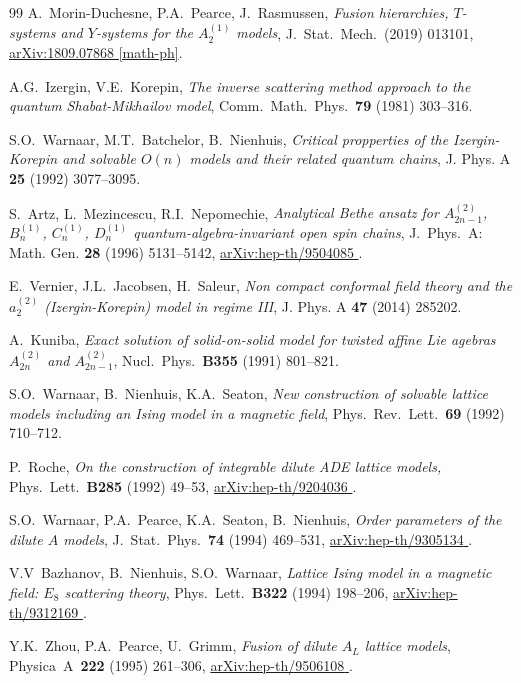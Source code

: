 \documentclass[11pt]{article}
\numberwithin{equation}{section}
\theoremstyle{plain}
\numberwithin{equation}{section}
\def\arxiv#1#2{\href{http://arxiv.org/abs/#1}{\textsf{arXiv:#1 #2}}}
\begin{document}
\begin{thebibliography}{99}
	A.~Morin-Duchesne, P.A.~Pearce, J.~Rasmussen,
	{\em Fusion hierarchies, $T$-systems and $Y$-systems for the $A_2^{(1)}$ models}, 
	J.~Stat.~Mech.~(2019) 013101,
	\arxiv{1809.07868}{[math-ph]}.

A.G.~Izergin, V.E.~Korepin, 
{\em The inverse scattering method approach to the quantum Shabat-Mikhailov model},
Comm.~Math.~Phys.~{\bf 79} (1981) 303--316.

S.O.~Warnaar, M.T.~Batchelor, B.~Nienhuis, 
{\em Critical propperties of the Izergin-Korepin and solvable $O(n)$ models and their related quantum chains}, 
J. Phys. A {\bf 25} (1992) 3077--3095.
		
S.~Artz, L.~Mezincescu, R.I.~Nepomechie,
{\em Analytical Bethe ansatz for $A_{2n-1}^{(2)}$, $B_n^{(1)}$, $C_n^{(1)}$, $D_n^{(1)}$ quantum-algebra-invariant open spin chains},
J.~Phys.~A: Math. Gen. {\bf 28} (1996) 5131--5142,
\arxiv{hep-th/9504085}{\!\!}.

E.~Vernier, J.L.~Jacobsen, H.~Saleur, 
{\em Non compact conformal field theory and the $a_2^{(2)}$ (Izergin-Korepin) model in regime III}, 
J. Phys. A {\bf 47} (2014) 285202.

A.~Kuniba, 
{\em Exact solution of solid-on-solid model for twisted affine Lie agebras $A_{2n}^{(2)}$ and $A_{2n-1}^{(2)}$}, 
Nucl.~Phys.~{\bf B355} (1991) 801--821.

S.O.~Warnaar, B.~Nienhuis, K.A.~Seaton,
{\em New construction of solvable lattice models including an Ising model in a magnetic field}, 
Phys.~Rev.~Lett.~{\bf 69} (1992) 710--712.

P.~Roche,
{\em On the construction of integrable dilute ADE lattice models,} 
Phys.~Lett.~{\bf B285} (1992) 49--53,
\arxiv{hep-th/9204036}{\!\!}.

S.O.~Warnaar, P.A.~Pearce, K.A.~Seaton, B.~Nienhuis, 
{\em Order parameters of the dilute $A$ models}, 
J.~Stat.~Phys.~{\bf 74} (1994) 469--531,
\arxiv{hep-th/9305134}{\!\!}.

V.V~Bazhanov, B.~Nienhuis, S.O.~Warnaar, 
{\em Lattice Ising model in a magnetic field: $E_8$ scattering theory}, 
Phys.~Lett.~{\bf B322} (1994) 198--206,
\arxiv{hep-th/9312169}{\!\!}.
	
Y.K.~Zhou, P.A.~Pearce, U.~Grimm,
{\em Fusion of dilute $A_L$ lattice models},
Physica~A~{\bf 222} (1995) 261--306,
\arxiv{hep-th/9506108}{\!\!}.


\end{thebibliography}
\end{document}
